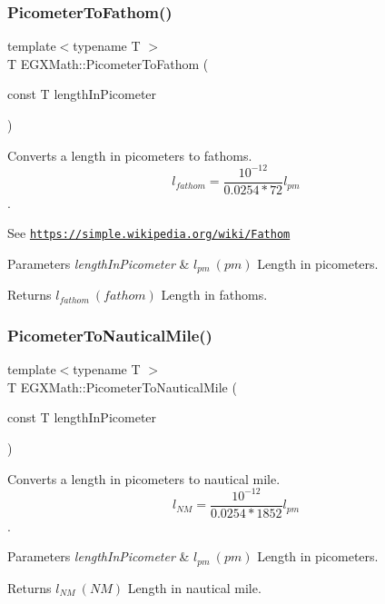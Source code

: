 \subsubsection{\texorpdfstring{Picometer\+To\+Fathom()}{PicometerToFathom()}}
{\footnotesize\ttfamily template$<$typename T $>$ \\
T E\+G\+X\+Math\+::\+Picometer\+To\+Fathom (\begin{DoxyParamCaption}\item[{const T}]{length\+In\+Picometer }\end{DoxyParamCaption})}



Converts a length in picometers to fathoms. \[ l_{fathom}= \frac{10^{-12}}{0.0254 * 72} l_{pm} \]. 

See \href{https://simple.wikipedia.org/wiki/Fathom}{\tt https\+://simple.\+wikipedia.\+org/wiki/\+Fathom} 
\begin{DoxyParams}{Parameters}
{\em length\+In\+Picometer} & $ l_{pm}\ (pm)$ Length in picometers. \\
\hline
\end{DoxyParams}
\begin{DoxyReturn}{Returns}
$ l_{fathom}\ (fathom)$ Length in fathoms. 
\end{DoxyReturn}
\mbox{\label{group___e_g_x_math-_conversions-_length_conversions-_picometer-_nautical_ga7127ef6c7c68736b7a24d2c65b8ac858}} 
\subsubsection{\texorpdfstring{Picometer\+To\+Nautical\+Mile()}{PicometerToNauticalMile()}}
{\footnotesize\ttfamily template$<$typename T $>$ \\
T E\+G\+X\+Math\+::\+Picometer\+To\+Nautical\+Mile (\begin{DoxyParamCaption}\item[{const T}]{length\+In\+Picometer }\end{DoxyParamCaption})}



Converts a length in picometers to nautical mile. \[ l_{NM}= \frac{10^{-12}}{0.0254 * 1852} l_{pm} \]. 


\begin{DoxyParams}{Parameters}
{\em length\+In\+Picometer} & $ l_{pm}\ (pm)$ Length in picometers. \\
\hline
\end{DoxyParams}
\begin{DoxyReturn}{Returns}
$ l_{NM}\ (NM)$ Length in nautical mile. 
\end{DoxyReturn}
